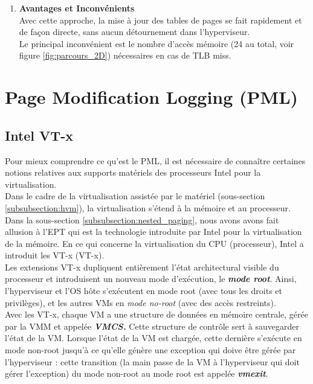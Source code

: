 \begin{enumerate}[label=\textbf{(\roman*)}]
    \item \textbf{Avantages et Inconvénients}\\
    Avec cette approche, la mise à jour des tables de pages se fait rapidement et de façon directe, sans aucun détournement dans l'hyperviseur.\\
    Le principal inconvénient est le nombre d'accès mémoire (24 au total, voir figure \ref{fig:parcours_2D}) nécessaires en cas de TLB miss.
\end{enumerate}

\section{Page Modification Logging (PML)}
\subsection{Intel VT-x}
Pour mieux comprendre ce qu'est le PML, il est nécessaire de connaître certaines notions relatives aux supports matériels des processeurs Intel pour la virtualisation.\\
Dans le cadre de la virtualisation assistée par le matériel (sous-section \ref{subsubsection:hvm}), la virtualisation s'étend à la mémoire et au processeur.  Dans la sous-section \ref{subsubsection:nested_paging}, nous avons avons fait allusion à l'EPT qui est la technologie introduite par Intel pour la virtualisation de la mémoire. En ce qui concerne la virtualisation du CPU (processeur), Intel a introduit les \acs{VT-x} (\acl{VT-x}).\\
Les extensions \acs{VT-x} dupliquent entièrement l'état architectural visible du processeur et introduisent un nouveau mode d'exécution, le \textbf{\textit{mode root}}. Ainsi, l'hyperviseur et l'\acs{OS} hôte s'exécutent en mode root (avec tous les droits et privilèges), et les autres VMs en \textit{mode no-root} (avec des accès restreints).\\
Avec les VT-x, chaque VM a une structure de données en mémoire centrale, gérée par la \acs{VMM} et appelée \textit{\textbf{\ac{VMCS}.}} Cette structure de contrôle sert à sauvegarder l'état de la VM. Lorsque l'état de la VM est chargée, cette dernière s'exécute en mode non-root jusqu'à ce qu'elle génère une exception qui doive être gérée par l'hyperviseur : cette transition (la main passe de la VM à l'hyperviseur qui doit gérer l'exception) du mode non-root au mode root est appelée \textit{\textbf{vmexit}}.

